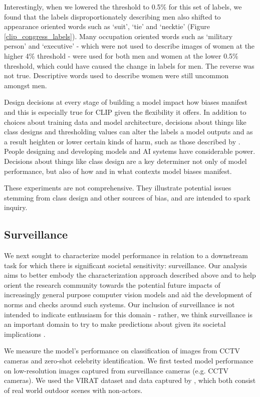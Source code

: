 Interestingly, when we lowered the threshold to 0.5\% for this set of labels, we found that the labels disproportionately describing men also shifted to appearance oriented words such as ‘suit’, ‘tie’ and ‘necktie’ (Figure \ref{clip_congress_labels}). Many occupation oriented words such as ‘military person’ and ‘executive’ - which were not used to describe images of women at the higher 4\% threshold - were used for both men and women at the lower 0.5\% threshold, which could have caused the change in labels for men. The reverse was not true. Descriptive words used to describe women were still uncommon amongst men.

Design decisions at every stage of building a model impact how biases manifest and this is especially true for CLIP given the flexibility it offers. In addition to choices about training data and model architecture, decisions about things like class designs and thresholding values can alter the labels a model outputs and as a result heighten or lower certain kinds of harm, such as those described by \citet{Crawford2017}. People designing and developing models and AI systems  have considerable power. Decisions about things like class design are a key determiner not only of model performance, but also of how and in what contexts model biases manifest.

These experiments are not comprehensive. They illustrate potential issues stemming from class design and other sources of bias, and are intended to spark inquiry.

\subsection{Surveillance}
We next sought to characterize model performance in relation to a downstream task for which there is significant societal sensitivity: surveillance. Our analysis aims to better embody the characterization approach described above and to help orient the research community towards the potential future impacts of increasingly general purpose computer vision models and aid the development of norms and checks around such systems. Our inclusion of surveillance is not intended to indicate enthusiasm for this domain - rather, we think surveillance is an important domain to try to make predictions about given its societal implications \citep{zuboff2015big,brownesurveillance}. 

We measure the model’s performance on classification of images from CCTV cameras and zero-shot celebrity identification. We first tested model performance on low-resolution images captured from surveillance cameras (e.g. CCTV cameras). We used the VIRAT dataset \citep{oh2011large} and data captured by \citet{varadarajan2009topic}, which both consist of real world outdoor scenes with non-actors.

